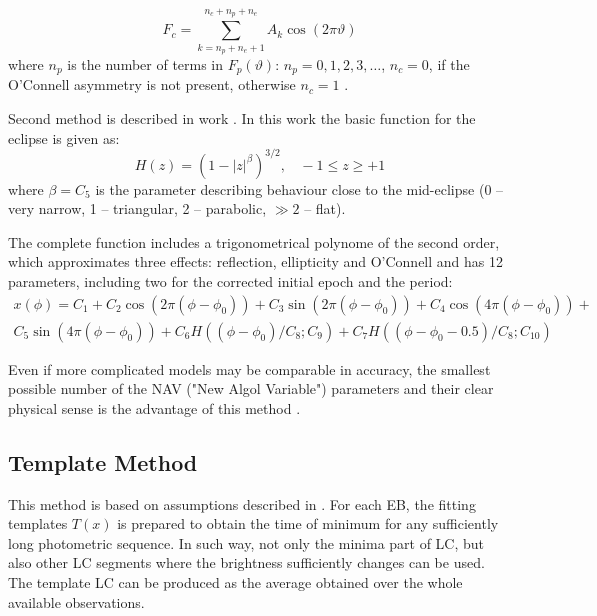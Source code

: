 \begin{equation}\label{eq:mik_Fc}
F_{c}  = \sum_{k=n_{p}+n_{e}+1}^{n_{c}+n_{p}+n_{e}} A_{k}\cos(2\pi\vartheta)
\end{equation}
where $n_{p}$ is the number of terms in $F_{p}(\vartheta)$: $n_{p} = 0, 1, 2, 3,\ldots $,
$n_{c} = 0$, if the O'Connell asymmetry is not present, otherwise $n_{c} = 1$ \citep{mikulasek2015}.

Second method is described in work \cite{andronov2016}. In this work the basic function for the eclipse is given as:
\begin{equation}\label{eq:andr_gen}
H(z)=(1-\left| z\right|^\beta)^{3/2}, ~~~~ -1\leq z \geq +1
\end{equation}
where $\beta=C_{5}$ 
is the parameter describing behaviour close to the mid-eclipse (0 -- very narrow, 1 -- triangular, 2 -- parabolic, $\gg2$ -- flat).

The complete function includes a trigonometrical polynome of the second order, which
approximates three effects: reflection, ellipticity and O'Connell and has 12 parameters, including two for the
corrected initial epoch and the period:
\begin{equation}\label{eq:andronov}
\begin{split}
x(\phi)=C_{1}+C_{2}\cos(2\pi(\phi-\phi_{0}))+ C_{3}\sin(2\pi(\phi-\phi_{0}))+C_{4}\cos(4\pi(\phi-\phi_{0}))+ \\
C_{5}\sin(4\pi(\phi-\phi_{0}))+ C_{6}H((\phi-\phi_{0})/C_{8};C_{9})+ C_{7}H((\phi-\phi_{0}-0.5)/C_{8};C_{10})
\end{split}
\end{equation}


Even if more complicated models may be comparable in accuracy, the smallest possible number 
of the NAV ("New Algol Variable") parameters and their clear physical sense is the advantage of this method \citep{andronov2016}.

\subsection{Template Method}
This method is based on assumptions described in \cite{Pribula2012, Pribulla2008}. 
For each EB, the fitting templates $T(x)$ is prepared to obtain the time of minimum 
for any sufficiently long photometric sequence. In such way, not only the minima part of LC, but also other LC segments where
the brightness sufficiently changes can be used. The template LC can be produced as the average obtained over the whole 
available observations.

